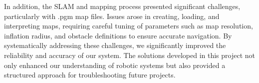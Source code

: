 \documentclass[english,project]{buwthesis}
\begin{document}
In addition, the SLAM and mapping process presented significant challenges, particularly with .pgm map files. Issues arose in creating, loading, and interpreting maps, requiring careful tuning of parameters such as map resolution, inflation radius, and obstacle definitions to ensure accurate navigation. By systematically addressing these challenges, we significantly improved the reliability and accuracy of our system. The solutions developed in this project not only enhanced our understanding of robotic systems but also provided a structured approach for troubleshooting future projects.
\end{document}
